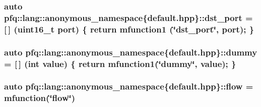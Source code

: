 \hypertarget{namespacepfq_1_1lang_1_1anonymous__namespace_02default_8hpp_03_a25a3b35caf255c109a6c5b4f601b1b61}{
\subsubsection[{dst\+\_\+port}]{\setlength{\rightskip}{0pt plus 5cm}auto pfq\+::lang\+::anonymous\+\_\+namespace\{default.\+hpp\}\+::dst\+\_\+port = \mbox{[}$\,$\mbox{]} (uint16\+\_\+t {\bf port}) \{ return {\bf mfunction1} (\char`\"{}dst\+\_\+port\char`\"{}, port); \}}}\label{namespacepfq_1_1lang_1_1anonymous__namespace_02default_8hpp_03_a25a3b35caf255c109a6c5b4f601b1b61}
\hypertarget{namespacepfq_1_1lang_1_1anonymous__namespace_02default_8hpp_03_ab1a38555cb05c81863153fa6113395e3}{
\subsubsection[{dummy}]{\setlength{\rightskip}{0pt plus 5cm}auto pfq\+::lang\+::anonymous\+\_\+namespace\{default.\+hpp\}\+::dummy = \mbox{[}$\,$\mbox{]} (int value) \{ return {\bf mfunction1}(\char`\"{}dummy\char`\"{}, value); \}}}\label{namespacepfq_1_1lang_1_1anonymous__namespace_02default_8hpp_03_ab1a38555cb05c81863153fa6113395e3}
\hypertarget{namespacepfq_1_1lang_1_1anonymous__namespace_02default_8hpp_03_af6c7518847c8c960b0e98cd856871a1b}{
\subsubsection[{flow}]{\setlength{\rightskip}{0pt plus 5cm}auto pfq\+::lang\+::anonymous\+\_\+namespace\{default.\+hpp\}\+::flow = {\bf mfunction}(\char`\"{}flow\char`\"{})}}\label{namespacepfq_1_1lang_1_1anonymous__namespace_02default_8hpp_03_af6c7518847c8c960b0e98cd856871a1b}
